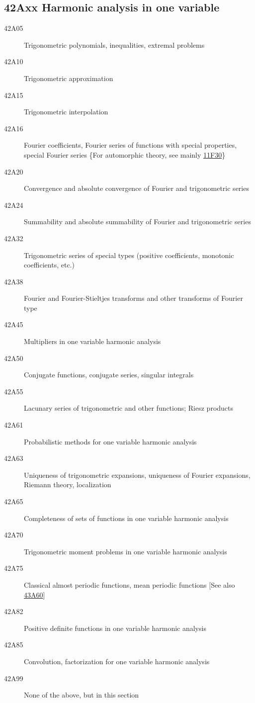 \subsection*{42Axx  Harmonic analysis in one variable }\label{42Axx}
\begin{description}  
\item [42A05]\label{42A05} Trigonometric polynomials, inequalities, extremal problems
\item [42A10]\label{42A10} Trigonometric approximation
\item [42A15]\label{42A15} Trigonometric interpolation
\item [42A16]\label{42A16} Fourier coefficients, Fourier series of functions with special properties, special Fourier series \{For automorphic theory, see mainly \hyperref[11F30]{11F30}\}
\item [42A20]\label{42A20} Convergence and absolute convergence of Fourier and trigonometric series
\item [42A24]\label{42A24} Summability and absolute summability of Fourier and trigonometric series
\item [42A32]\label{42A32} Trigonometric series of special types (positive coefficients, monotonic coefficients, etc.)
\item [42A38]\label{42A38} Fourier and Fourier-Stieltjes transforms and other transforms of Fourier type
\item [42A45]\label{42A45} Multipliers in one variable harmonic analysis
\item [42A50]\label{42A50} Conjugate functions, conjugate series, singular integrals
\item [42A55]\label{42A55} Lacunary series of trigonometric and other functions; Riesz products
\item [42A61]\label{42A61} Probabilistic methods for one variable harmonic analysis
\item [42A63]\label{42A63} Uniqueness of trigonometric expansions, uniqueness of Fourier expansions, Riemann theory, localization
\item [42A65]\label{42A65} Completeness of sets of functions in one variable harmonic analysis
\item [42A70]\label{42A70} Trigonometric moment problems in one variable harmonic analysis
\item [42A75]\label{42A75} Classical almost periodic functions, mean periodic functions [See also \hyperref[43A60]{43A60}]
\item [42A82]\label{42A82} Positive definite functions in one variable harmonic analysis
\item [42A85]\label{42A85} Convolution, factorization for one variable harmonic analysis
\item [42A99]\label{42A99} None of the above, but in this section
\end{description}
